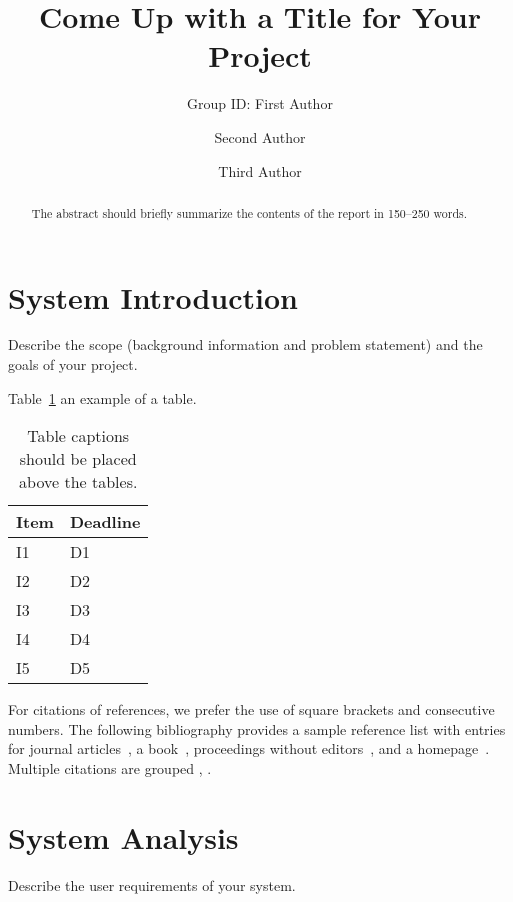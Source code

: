 \documentclass[runningheads]{llncs}
\begin{document}
%
\title{Come Up with a Title for Your Project}

\author{Group ID: First Author \and
Second Author \and
Third Author}

%
\maketitle              %
%
\begin{abstract}
The abstract should briefly summarize the contents of the report in
150--250 words. 

\end{abstract}
%
%
%
\section{System Introduction}
Describe the scope (background information and problem statement) and the goals of your project.

Table~\ref{tab1} an example of a table.

\begin{table}
\caption{Table captions should be placed above the
tables.}\label{tab1}
\begin{tabular}{|l|l|}
\hline
Item & Deadline \\
\hline
I1 & D1 \\
I2 & D2 \\
I3 & D3 \\
I4 & D4 \\
I5 & D5 \\
\hline
\end{tabular}
\end{table}

For citations of references, we prefer the use of square brackets
and consecutive numbers. The following bibliography provides
a sample reference list with entries for journal
articles~\cite{ref_article1}, a book~\cite{ref_book1}, proceedings without editors~\cite{ref_proc1},
and a homepage~\cite{ref_url1}. Multiple citations are grouped
\cite{ref_article1,ref_book1},
\cite{ref_article1,ref_book1,ref_proc1,ref_url1}.

\section{System Analysis}
Describe the user requirements of your system.
\end{document}

